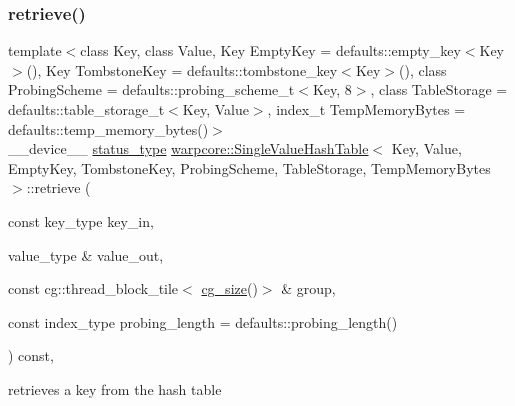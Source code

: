 \subsubsection{\texorpdfstring{retrieve()}{retrieve()}\hspace{0.1cm}{\footnotesize\ttfamily [1/3]}}
{\footnotesize\ttfamily template$<$class Key, class Value, Key Empty\+Key = defaults\+::empty\+\_\+key$<$\+Key$>$(), Key Tombstone\+Key = defaults\+::tombstone\+\_\+key$<$\+Key$>$(), class Probing\+Scheme = defaults\+::probing\+\_\+scheme\+\_\+t$<$\+Key, 8$>$, class Table\+Storage = defaults\+::table\+\_\+storage\+\_\+t$<$\+Key, Value$>$, index\+\_\+t Temp\+Memory\+Bytes = defaults\+::temp\+\_\+memory\+\_\+bytes()$>$ \\
\+\_\+\+\_\+device\+\_\+\+\_\+ \hyperlink{classwarpcore_1_1Status}{status\+\_\+type} \hyperlink{classwarpcore_1_1SingleValueHashTable}{warpcore\+::\+Single\+Value\+Hash\+Table}$<$ Key, Value, Empty\+Key, Tombstone\+Key, Probing\+Scheme, Table\+Storage, Temp\+Memory\+Bytes $>$\+::retrieve (\begin{DoxyParamCaption}\item[{const key\+\_\+type}]{key\+\_\+in,  }\item[{value\+\_\+type \&}]{value\+\_\+out,  }\item[{const cg\+::thread\+\_\+block\+\_\+tile$<$ \hyperlink{classwarpcore_1_1SingleValueHashTable_aaa4cf7e3252a0b177101fca437e5309e}{cg\+\_\+size}()$>$ \&}]{group,  }\item[{const index\+\_\+type}]{probing\+\_\+length = {\ttfamily defaults\+:\+:probing\+\_\+length()} }\end{DoxyParamCaption}) const\hspace{0.3cm}{\ttfamily [inline]}, {\ttfamily [noexcept]}}



retrieves a key from the hash table 


